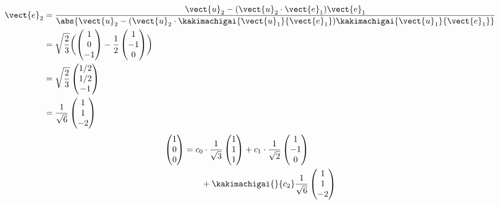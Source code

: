 \begin{align*}
\vect{e}_{2}&=\frac{\vect{u}_{2}-(\vect{u}_{2}\cdot\vect{e}_{1})\vect{e}_{1}}{\abs{\vect{u}_{2}-(\vect{u}_{2}\cdot\kakimachigai{\vect{u}_{1}}{\vect{e}_{1}})\kakimachigai{\vect{u}_{1}}{\vect{e}_{1}}}}\\
&=\sqrt{\frac{2}{3}}\biggl(\begin{pmatrix}1\\0\\-1\end{pmatrix}-\frac{1}{2}\begin{pmatrix}1\\-1\\0\end{pmatrix}\biggr)\\
&=\sqrt{\frac{2}{3}}\begin{pmatrix}1/2\\1/2\\-1\end{pmatrix}\\
&=\frac{1}{\sqrt{6}}\begin{pmatrix}1\\1\\-2\end{pmatrix}
\end{align*}
\begin{align*}
\begin{pmatrix}1\\0\\0\end{pmatrix}
&=c_{0}\cdot\frac{1}{\sqrt{3}}\begin{pmatrix}1\\1\\1\end{pmatrix}+c_{1}\cdot\frac{1}{\sqrt{2}}\begin{pmatrix}1\\-1\\0\end{pmatrix}\\
&\qquad+\kakimachigai{}{c_{2}}\frac{1}{\sqrt{6}}\begin{pmatrix}1\\1\\-2\end{pmatrix}
\end{align*}
